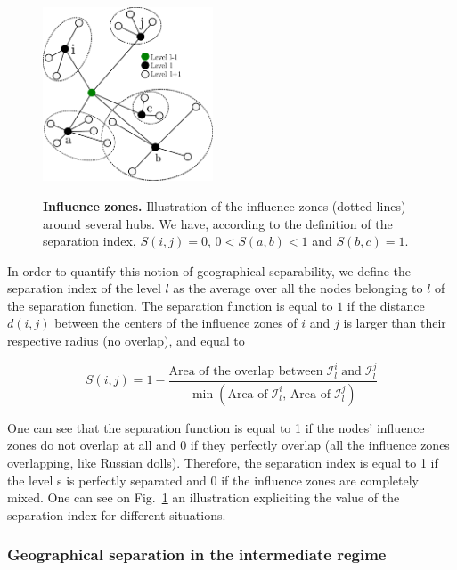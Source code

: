 \begin{figure}
    \centering
    \includegraphics[width=0.45\textwidth]{gfx/chapter-networks/figure10.pdf}\\
    \caption{{\bf Influence zones.} Illustration of the influence zones (dotted
    lines) around several hubs. We have, according to the definition of the
separation index, $S(i,j)=0$, $0 < S(a,b)< 1$ and $S(b,c)=1$.
\label{fig:separation_illustration}} 
\end{figure}

In order to quantify this notion of geographical separability, we define the
separation index of the level $l$ as the average over all the nodes belonging to
$l$ of the separation function. The separation function is equal to $1$ if the
distance $d(i,j)$ between the centers of the influence zones of $i$ and $j$ is
larger than their respective radius (no overlap), and equal to 

\begin{equation}
    S(i,j) = 1-\frac{\text{Area of the overlap between} \; \mathcal{I}_l^i \; \text{and} \; \mathcal{I}_l^j}{\min \left(\text{Area of} \; \mathcal{I}_l^i\text{, Area of} \; \mathcal{I}_l^j\right)}
\end{equation}

One can see that the separation function is equal to 1 if the nodes' influence
zones do not overlap at all and 0 if they perfectly overlap (all the influence
zones overlapping, like Russian dolls). Therefore, the separation index is equal
to 1 if the level s is perfectly separated and 0 if the influence zones are
completely mixed. One can see on Fig.~\ref{fig:separation_illustration} an
illustration expliciting the value of the separation index for different
situations.

\subsubsection{Geographical separation in the intermediate regime}
\label{ssub:geographical_separation_of_simulated_graphs}

